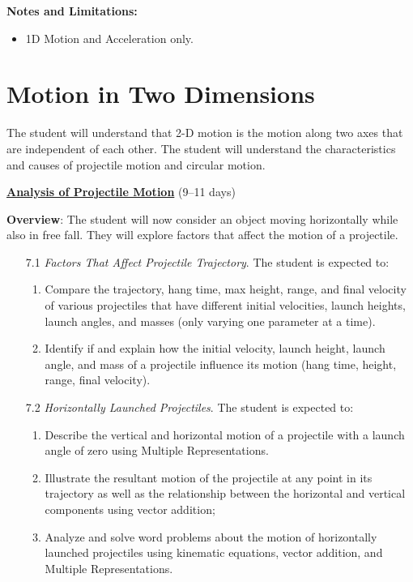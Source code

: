 \documentclass[dvipsnames]{article}
\begin{document}
\textbf{Notes and Limitations:}

\begin{itemize}[itemsep=0pt,topsep=-3pt]
    \item 1D Motion and Acceleration only.
\end{itemize}



\section{Motion in Two Dimensions}

\vspace{-3pt}
The student will understand that 2-D motion is the motion along two axes that are independent of each other. The student will understand the characteristics and causes of projectile motion and circular motion.
\vspace{3pt}

\textbf{\underline{Analysis of Projectile Motion}} (9--11 days)

\textbf{Overview}: The student will now consider an object moving horizontally while also in free fall.  They will explore factors that affect the motion of a projectile.  

\begin{enumerate}
    \item[7.1] \textit{Factors That Affect Projectile Trajectory}. The student is expected to:
    \begin{enumerate}
        \item Compare the trajectory, hang time, max height, range, and final velocity of various projectiles that have different initial velocities, launch heights, launch angles, and masses (only varying one parameter at a time).
        \item Identify if and explain how the  initial velocity, launch height, launch angle, and mass of a projectile influence its motion (hang time, height, range, final velocity).
    \end{enumerate}
    \item[7.2] \textit{Horizontally Launched Projectiles}. The student is expected to:
    \begin{enumerate}
        \item Describe the vertical and horizontal motion of a projectile with a launch angle of zero using Multiple Representations.
        \item Illustrate the resultant motion of the projectile at any point in its trajectory as well as the relationship between the horizontal and vertical components using vector addition;
        \item Analyze and solve word problems about the motion of  horizontally launched projectiles using kinematic equations, vector addition, and  Multiple Representations.
    \end{enumerate}
\end{enumerate}
\end{document}
